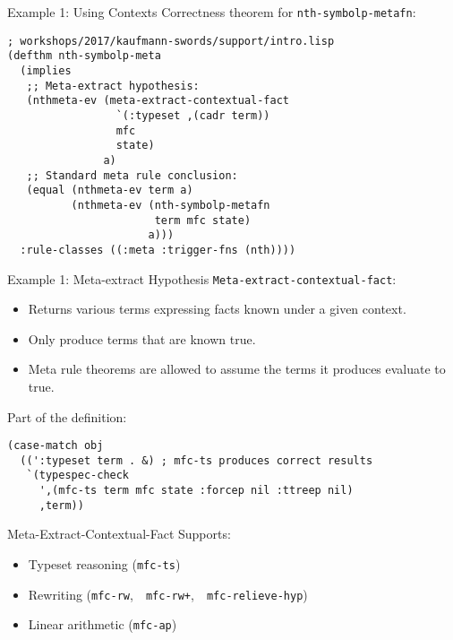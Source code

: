 \begin{frame}[fragile]{Example 1: Using Contexts}
Correctness theorem for \texttt{nth-symbolp-metafn}:

\begin{Verbatim}[formatcom=\small]
; workshops/2017/kaufmann-swords/support/intro.lisp
(defthm nth-symbolp-meta
  (implies
   ;; Meta-extract hypothesis:
   (nthmeta-ev (meta-extract-contextual-fact
                 `(:typeset ,(cadr term))
                 mfc 
                 state)
               a)
   ;; Standard meta rule conclusion:
   (equal (nthmeta-ev term a)
          (nthmeta-ev (nth-symbolp-metafn
                       term mfc state)
                      a)))
  :rule-classes ((:meta :trigger-fns (nth))))
\end{Verbatim}

\end{frame}
\begin{frame}[fragile]{Example 1: Meta-extract Hypothesis}
  \texttt{Meta-extract-contextual-fact}:
\begin{itemize}
\item Returns various terms expressing facts known under a given context.
\item Only produce terms that are known true.
\item Meta rule theorems are allowed to assume the terms it produces
  evaluate to true.
\end{itemize}
Part of the definition:
\begin{Verbatim}[formatcom=\small]
(case-match obj
  ((':typeset term . &) ; mfc-ts produces correct results
   `(typespec-check
     ',(mfc-ts term mfc state :forcep nil :ttreep nil)
     ,term))
\end{Verbatim}
\end{frame}
\begin{frame}[fragile]{Meta-Extract-Contextual-Fact}
Supports:
\begin{itemize}
\item Typeset reasoning (\texttt{mfc-ts})
\item Rewriting (\texttt{mfc-rw},\ \ \texttt{mfc-rw+},\ \ \texttt{mfc-relieve-hyp})
\item Linear arithmetic (\texttt{mfc-ap})
\end{itemize}
\end{frame}

